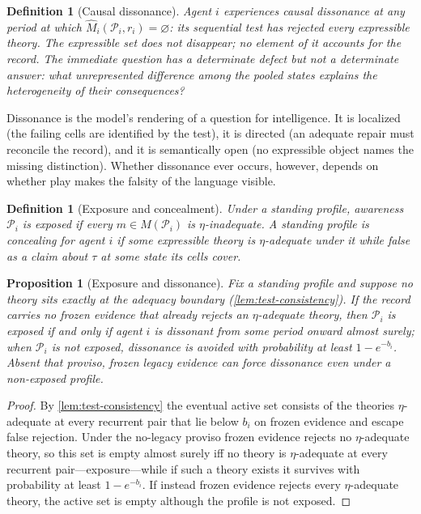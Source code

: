 \documentclass[11pt]{article}
\newtheorem{definition}[assumption]{Definition}
\newtheorem{proposition}[assumption]{Proposition}
\theoremstyle{definition}
\newcommand{\emptysetset}{\varnothing}
\begin{document}
\begin{definition}[Causal dissonance]
\label{def:dissonance}
Agent $i$ experiences \emph{causal dissonance} at any period at which $\widehat M_i(\mathcal P_i,r_i)=\emptysetset$: its sequential test has rejected every expressible theory.
The expressible set does not disappear; no element of it accounts for the record.
The immediate question has a determinate defect but not a determinate answer: \emph{what unrepresented difference among the pooled states explains the heterogeneity of their consequences?}
\end{definition}

Dissonance is the model's rendering of a question for intelligence.
It is localized (the failing cells are identified by the test), it is directed (an adequate repair must reconcile the record), and it is semantically open (no expressible object names the missing distinction).
Whether dissonance ever occurs, however, depends on whether play makes the falsity of the language visible.

\begin{definition}[Exposure and concealment]
\label{def:exposure}
Under a standing profile, awareness $\mathcal P_i$ is \emph{exposed} if every $m\in M(\mathcal P_i)$ is $\eta$-inadequate.
A standing profile is \emph{concealing} for agent $i$ if some expressible theory is $\eta$-adequate under it while false as a claim about $\tau$ at some state its cells cover.
\end{definition}

\begin{proposition}[Exposure and dissonance]
\label{prop:exposure}
Fix a standing profile and suppose no theory sits exactly at the adequacy boundary (\cref{lem:test-consistency}).
If the record carries no frozen evidence that already rejects an $\eta$-adequate theory, then $\mathcal P_i$ is exposed if and only if agent $i$ is dissonant from some period onward almost surely; when $\mathcal P_i$ is not exposed, dissonance is avoided with probability at least $1-e^{-b_i}$.
Absent that proviso, frozen legacy evidence can force dissonance even under a non-exposed profile.
\end{proposition}

\begin{proof}
By \cref{lem:test-consistency} the eventual active set consists of the theories $\eta$-adequate at every recurrent pair that lie below $b_i$ on frozen evidence and escape false rejection.
Under the no-legacy proviso frozen evidence rejects no $\eta$-adequate theory, so this set is empty almost surely iff no theory is $\eta$-adequate at every recurrent pair---exposure---while if such a theory exists it survives with probability at least $1-e^{-b_i}$.
If instead frozen evidence rejects every $\eta$-adequate theory, the active set is empty although the profile is not exposed.
\end{proof}
\end{document}
